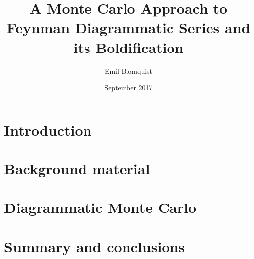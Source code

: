 \documentclass[nocoverpage,swedish,g5paper]{thesis}
\title{A Monte Carlo Approach to Feynman Diagrammatic Series and its Boldification}
\author{Emil Blomquist}
\date{September 2017}
\begin{document}
\begin{abstract}

\end{abstract}

\begin{otherlanguage}{swedish}
\begin{foreginabstract}

\end{foreginabstract}
\end{otherlanguage}

\begin{preface}

\end{preface}

\tableofcontents

\mainmatter


%

\chapter{Introduction}


\chapter{Background material}


\chapter{Diagrammatic Monte Carlo}
 

\chapter{Summary and conclusions}


%

\cleardoublepage
{}





%
\end{document}
